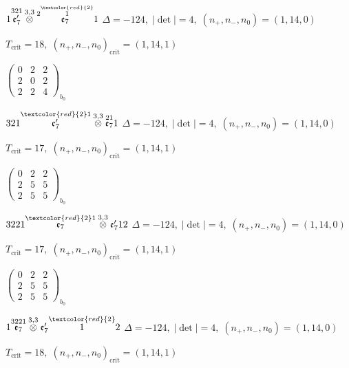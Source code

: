 \documentclass[10pt]{article}
\begin{document}
$1\overset{321}{\mathfrak{e}_7'}\overset{3,3}{\otimes}\overset{2\overset{\textcolor{red}{2}}{1}}{\mathfrak{e}_7}1$ \quad $\Delta=-124,\; |\det|=4,\; (n_+,n_-,n_0)=(1,14,0)$

\hspace{1em}$T_{\text{crit}}=18,\; (n_+,n_-,n_0)_{\text{crit}}=(1,14,1)$

\hspace{2em}$\left(\begin{smallmatrix}0 & 2 & 2 \\ 2 & 0 & 2 \\ 2 & 2 & 4\end{smallmatrix}\right)_{\!b_0}$

$321\overset{\textcolor{red}{2}1}{\mathfrak{e}_7'}\overset{3,3}{\otimes}\overset{21}{\mathfrak{e}_7}1$ \quad $\Delta=-124,\; |\det|=4,\; (n_+,n_-,n_0)=(1,14,0)$

\hspace{1em}$T_{\text{crit}}=17,\; (n_+,n_-,n_0)_{\text{crit}}=(1,14,1)$

\hspace{2em}$\left(\begin{smallmatrix}0 & 2 & 2 \\ 2 & 5 & 5 \\ 2 & 5 & 5\end{smallmatrix}\right)_{\!b_0}$

\smallskip

$3221\overset{\textcolor{red}{2}1}{\mathfrak{e}_7}\overset{3,3}{\otimes}\mathfrak{e}_7'12$ \quad $\Delta=-124,\; |\det|=4,\; (n_+,n_-,n_0)=(1,14,0)$

\hspace{1em}$T_{\text{crit}}=17,\; (n_+,n_-,n_0)_{\text{crit}}=(1,14,1)$

\hspace{2em}$\left(\begin{smallmatrix}0 & 2 & 2 \\ 2 & 5 & 5 \\ 2 & 5 & 5\end{smallmatrix}\right)_{\!b_0}$

$1\overset{3221}{\mathfrak{e}_7}\overset{3,3}{\otimes}\mathfrak{e}_7'\overset{\textcolor{red}{2}}{1}2$ \quad $\Delta=-124,\; |\det|=4,\; (n_+,n_-,n_0)=(1,14,0)$

\hspace{1em}$T_{\text{crit}}=18,\; (n_+,n_-,n_0)_{\text{crit}}=(1,14,1)$
\end{document}
